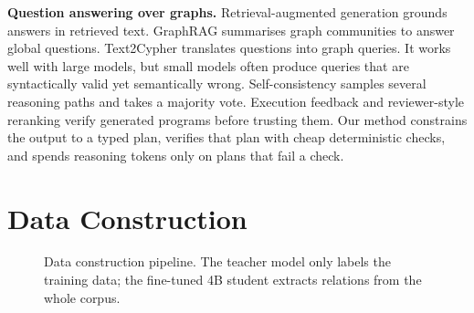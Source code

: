 \documentclass[11pt]{article}
\begin{document}
\textbf{Question answering over graphs.} Retrieval-augmented generation \cite{lewis2020retrieval} grounds answers in retrieved text. GraphRAG \cite{edge2024local} summarises graph communities to answer global questions. Text2Cypher \cite{ozsoy2024text2cypher} translates questions into graph queries. It works well with large models, but small models often produce queries that are syntactically valid yet semantically wrong. Self-consistency \cite{wang2023selfconsistency} samples several reasoning paths and takes a majority vote. Execution feedback \cite{chen2024teaching,ni2023lever} and reviewer-style reranking \cite{zhang2023coder} verify generated programs before trusting them. Our method constrains the output to a typed plan, verifies that plan with cheap deterministic checks, and spends reasoning tokens only on plans that fail a check.

\section{Data Construction}
\begin{figure}[t]\centering
{}
\caption{Data construction pipeline. The teacher model only labels the training data; the fine-tuned 4B student extracts relations from the whole corpus.}
\label{fig:pipeline}
\end{figure}
\end{document}
